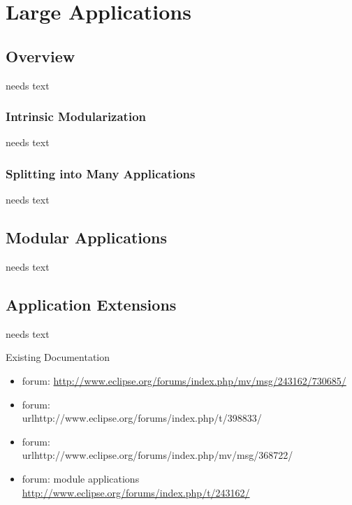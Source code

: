 \documentclass[a4paper,10pt,twoside]{book}
\begin{document}
  \sloppy
\fi


\chapter{Large Applications}

\section{Overview}
needs text

\subsection{Intrinsic Modularization}
needs text

\subsection{Splitting into Many Applications}
needs text

\section{Modular Applications}
needs text

\section{Application Extensions}
needs text

\noindent Existing Documentation
\begin{itemize}
  \item forum: \url{http://www.eclipse.org/forums/index.php/mv/msg/243162/730685/}
  \item forum: \\url{http://www.eclipse.org/forums/index.php/t/398833/}
  \item forum: \\url{http://www.eclipse.org/forums/index.php/mv/msg/368722/}
  \item forum: \multi module applications \url{http://www.eclipse.org/forums/index.php/t/243162/}
\end{itemize}


\ifx\wholebook\relax\else
   
   
\end{document}
